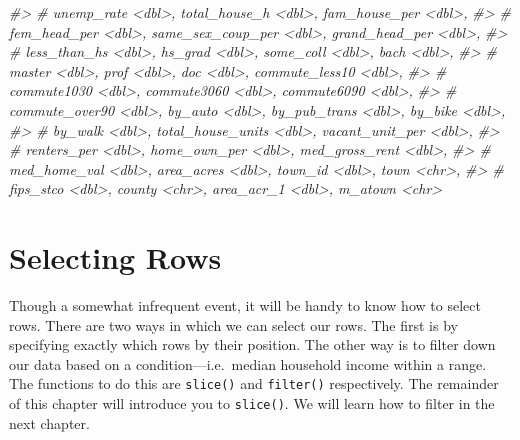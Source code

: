 \documentclass[
]{book}
\newenvironment{Shaded}{\begin{snugshade}}{\end{snugshade}}
\newcommand{\CommentTok}[1]{\textcolor[rgb]{0.56,0.35,0.01}{\textit{#1}}}
\begin{document}
\begin{Shaded}
\begin{Highlighting}[]
\CommentTok{\#\textgreater{} \#   unemp\_rate \textless{}dbl\textgreater{}, total\_house\_h \textless{}dbl\textgreater{}, fam\_house\_per \textless{}dbl\textgreater{},}
\CommentTok{\#\textgreater{} \#   fem\_head\_per \textless{}dbl\textgreater{}, same\_sex\_coup\_per \textless{}dbl\textgreater{}, grand\_head\_per \textless{}dbl\textgreater{},}
\CommentTok{\#\textgreater{} \#   less\_than\_hs \textless{}dbl\textgreater{}, hs\_grad \textless{}dbl\textgreater{}, some\_coll \textless{}dbl\textgreater{}, bach \textless{}dbl\textgreater{},}
\CommentTok{\#\textgreater{} \#   master \textless{}dbl\textgreater{}, prof \textless{}dbl\textgreater{}, doc \textless{}dbl\textgreater{}, commute\_less10 \textless{}dbl\textgreater{},}
\CommentTok{\#\textgreater{} \#   commute1030 \textless{}dbl\textgreater{}, commute3060 \textless{}dbl\textgreater{}, commute6090 \textless{}dbl\textgreater{},}
\CommentTok{\#\textgreater{} \#   commute\_over90 \textless{}dbl\textgreater{}, by\_auto \textless{}dbl\textgreater{}, by\_pub\_trans \textless{}dbl\textgreater{}, by\_bike \textless{}dbl\textgreater{},}
\CommentTok{\#\textgreater{} \#   by\_walk \textless{}dbl\textgreater{}, total\_house\_units \textless{}dbl\textgreater{}, vacant\_unit\_per \textless{}dbl\textgreater{},}
\CommentTok{\#\textgreater{} \#   renters\_per \textless{}dbl\textgreater{}, home\_own\_per \textless{}dbl\textgreater{}, med\_gross\_rent \textless{}dbl\textgreater{},}
\CommentTok{\#\textgreater{} \#   med\_home\_val \textless{}dbl\textgreater{}, area\_acres \textless{}dbl\textgreater{}, town\_id \textless{}dbl\textgreater{}, town \textless{}chr\textgreater{},}
\CommentTok{\#\textgreater{} \#   fips\_stco \textless{}dbl\textgreater{}, county \textless{}chr\textgreater{}, area\_acr\_1 \textless{}dbl\textgreater{}, m\_atown \textless{}chr\textgreater{}}
\end{Highlighting}
\end{Shaded}

\hypertarget{selecting-rows}{%
\section{Selecting Rows}\label{selecting-rows}}

Though a somewhat infrequent event, it will be handy to know how to select rows. There are two ways in which we can select our rows. The first is by specifying exactly which rows by their position. The other way is to filter down our data based on a condition---i.e.~median household income within a range. The functions to do this are \texttt{slice()} and \texttt{filter()} respectively. The remainder of this chapter will introduce you to \texttt{slice()}. We will learn how to filter in the next chapter.
\end{document}
